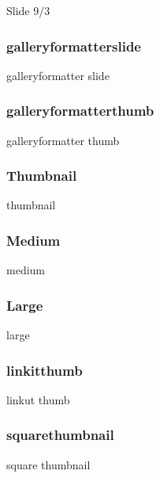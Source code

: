 Slide 9/3 

\subsubsection{galleryformatterslide}

galleryformatter slide 

\subsubsection{galleryformatterthumb}

galleryformatter thumb 

\subsubsection{Thumbnail}

thumbnail 

\subsubsection{Medium}

medium 

\subsubsection{Large}

large 

\subsubsection{linkitthumb}

linkut thumb 

\subsubsection{squarethumbnail}

square thumbnail 